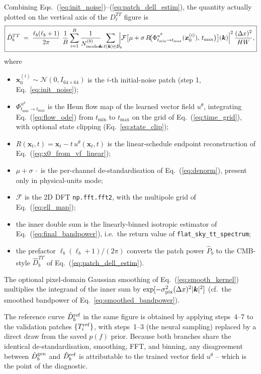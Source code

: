 \documentclass[11pt]{article}
\DeclareRobustCommand{\xvec}{\bm{x}}
\theoremstyle{definition}
\begin{document}
Combining Eqs.~(\ref{eq:init_noise})--(\ref{eq:patch_dell_estim}), the
quantity actually plotted on the vertical axis of the $D_\ell^{TT}$ figure is
\begin{equation}
\boxed{
  \hat D_b^{TT}
  \;=\; \frac{\ell_b(\ell_b+1)}{2\pi}\;
        \frac{1}{B}\sum_{i=1}^{B}\frac{1}{N^{(b)}_{\rm modes}}
        \!\!\!\sum_{\bm k:\ell(\bm k)\in\mathcal B_b}\!\!\!
        \Bigl|\mathcal F\bigl[\mu + \sigma\,
              R\!\bigl(\Phi_{t_{\min}\to t_{\max}}^{u^\theta}(\xvec_0^{(i)}),\,
                       t_{\max}\bigr)\bigr](\bm k)\Bigr|^2\,
        \frac{(\Delta x)^2}{HW},
}
  \label{eq:end_to_end}
\end{equation}
where
\begin{itemize}[leftmargin=2.0em,itemsep=0.15em]
  \item $\xvec_0^{(i)}\sim\mathcal N(0,I_{64\times 64})$ is the $i$-th
    initial-noise patch (step 1, Eq.~\ref{eq:init_noise});
  \item $\Phi_{t_{\min}\to t_{\max}}^{u^\theta}$ is the Heun flow map of the
    learned vector field $u^\theta$, integrating
    Eq.~(\ref{eq:flow_ode}) from $t_{\min}$ to $t_{\max}$ on the grid of
    Eq.~(\ref{eq:time_grid}), with optional state clipping
    (Eq.~\ref{eq:state_clip});
  \item $R(\xvec_t,t)=\xvec_t-t\,u^\theta(\xvec_t,t)$ is the linear-schedule
    endpoint reconstruction of Eq.~(\ref{eq:x0_from_vf_linear});
  \item $\mu+\sigma\,\cdot$ is the per-channel de-standardisation of
    Eq.~(\ref{eq:denorm}), present only in physical-units mode;
  \item $\mathcal F$ is the 2D DFT \texttt{np.fft.fft2}, with the multipole
    grid of Eq.~(\ref{eq:ell_map});
  \item the inner double sum is the linearly-binned isotropic estimator of
    Eq.~(\ref{eq:final_bandpower}), i.e.\ the return value of
    \texttt{flat\_sky\_tt\_spectrum};
  \item the prefactor $\ell_b(\ell_b+1)/(2\pi)$ converts the patch power
    $\hat P_b$ to the CMB-style $\hat D_b^{TT}$ of
    Eq.~(\ref{eq:patch_dell_estim}).
\end{itemize}
The optional pixel-domain Gaussian smoothing of Eq.~(\ref{eq:smooth_kernel})
multiplies the integrand of the inner sum by
$\exp[-\sigma_{\rm pix}^2(\Delta x)^2|\bm k|^2]$ (cf.\ the smoothed
bandpower of Eq.~\ref{eq:smoothed_bandpower}).

The reference curve $\hat D_b^{\rm ref}$ in the same figure is obtained by
applying steps~4--7 to the validation patches $\{T_i^{\rm ref}\}$, with
steps~1--3 (the neural sampling) replaced by a direct draw from the saved
$p(f)$ prior. Because both branches share the identical de-standardisation,
smoothing, FFT, and binning, any disagreement between $\hat D_b^{\rm gen}$
and $\hat D_b^{\rm ref}$ is attributable to the trained vector field
$u^\theta$ -- which is the point of the diagnostic.
\end{document}
